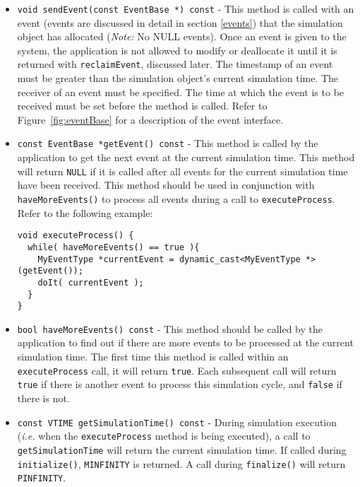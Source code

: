 \documentclass[11pt]{article}
\begin{document}
\begin{itemize}

\item {\tt void sendEvent(const EventBase *) const} - This method is called 
  with an event (events are discussed in detail in section \ref{events})
  that the simulation object has allocated (\emph{Note:} No NULL events).
  Once an event is given to the system, the application is not allowed to
  modify or deallocate it until it is returned with {\tt reclaimEvent},
  discussed later.  The timestamp of an event must be greater than the
  simulation object's current simulation time. The receiver of an event
  must be specified. The time at which the event is to be received must be
  set before the method is called.  Refer to Figure~\ref{fig:eventBase} for
  a description of the event interface.

\item{\tt const EventBase *getEvent() const} - This method is called by
  the application to get the next event at the current simulation time.
  This method will return {\tt NULL} if it is called after all events for
  the current simulation time have been received.  This method should be
  used in conjunction with {\tt haveMoreEvents()} to process all events
  during a call to {\tt executeProcess}.  Refer to the following example:

\begin{verbatim}
void executeProcess() {
  while( haveMoreEvents() == true ){
    MyEventType *currentEvent = dynamic_cast<MyEventType *>(getEvent());
    doIt( currentEvent );
  }
}
\end{verbatim}

\item{\tt bool haveMoreEvents() const} - This method should be called by the 
  application to find out if there are more events to be processed at the
  current simulation time.  The first time this method is called within an
  {\tt executeProcess} call, it will return {\tt true}.  Each subsequent
  call will return {\tt true} if there is another event to process this
  simulation cycle, and {\tt false} if there is not.

\item{\tt const VTIME getSimulationTime() const} - During simulation
  execution (\textit{i.e.} when the \texttt{executeProcess} method is being
  executed), a call to {\tt getSimulationTime} will return the current
  simulation time.  If called during {\tt initialize()}, {\tt MINFINITY} is
  returned.  A call during {\tt finalize()} will return {\tt PINFINITY}.
  

\end{itemize}
\end{document}
